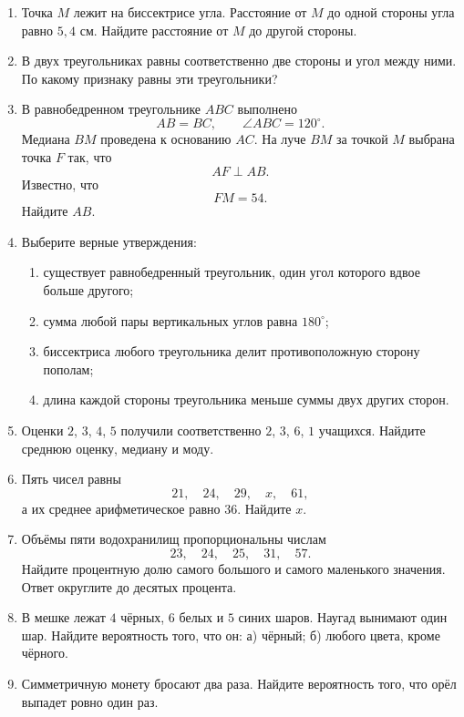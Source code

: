 \documentclass[a4paper,12pt]{article}
\newcommand{\degree}{^{\circ}}
\begin{document}
\begin{enumerate}[label=\textbf{\arabic*.}]
  \item
  Точка $M$ лежит на биссектрисе угла.
  Расстояние от $M$ до одной стороны угла равно $5{,}4$ см.
  Найдите расстояние от $M$ до другой стороны.

  \item
  В двух треугольниках равны соответственно две стороны и угол между ними.
  По какому признаку равны эти треугольники?

  \item
  В равнобедренном треугольнике $ABC$ выполнено
  \[
    AB=BC,
    \qquad
    \angle ABC=120\degree.
  \]
  Медиана $BM$ проведена к основанию $AC$.
  На луче $BM$ за точкой $M$ выбрана точка $F$ так, что
  \[
    AF\perp AB.
  \]
  Известно, что
  \[
    FM=54.
  \]
  Найдите $AB$.

  \item
  Выберите верные утверждения:
  \begin{enumerate}[label=\arabic*)]
    \item
    существует равнобедренный треугольник, один угол которого
    вдвое больше другого;

    \item
    сумма любой пары вертикальных углов равна $180\degree$;

    \item
    биссектриса любого треугольника делит противоположную сторону пополам;

    \item
    длина каждой стороны треугольника меньше суммы двух других сторон.
  \end{enumerate}

  \item
  Оценки $2$, $3$, $4$, $5$ получили соответственно
  $2$, $3$, $6$, $1$ учащихся.
  Найдите среднюю оценку, медиану и моду.

  \item
  Пять чисел равны
  \[
    21,\quad24,\quad29,\quad x,\quad61,
  \]
  а их среднее арифметическое равно $36$.
  Найдите $x$.

  \item
  Объёмы пяти водохранилищ пропорциональны числам
  \[
    23,\quad24,\quad25,\quad31,\quad57.
  \]
  Найдите процентную долю самого большого и самого маленького значения.
  Ответ округлите до десятых процента.

  \item
  В мешке лежат $4$ чёрных, $6$ белых и $5$ синих шаров.
  Наугад вынимают один шар.
  Найдите вероятность того, что он:
  а) чёрный;
  б) любого цвета, кроме чёрного.

  \item
  Симметричную монету бросают два раза.
  Найдите вероятность того, что орёл выпадет ровно один раз.

\end{enumerate}
\end{document}
